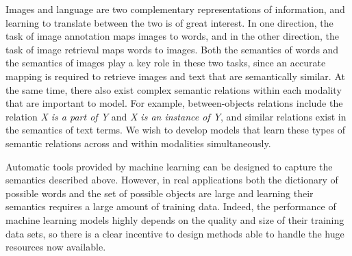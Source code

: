 
Images and language are two complementary representations of
information, and learning to translate between the two is of great
interest. In one direction, the task of image annotation maps images
to words, and in the other direction, the task of image retrieval maps
words to images. Both the semantics of words and the semantics of
images play a key role in these two tasks, since an accurate mapping
is required to retrieve images and text that are semantically similar. At
the same time, there also exist complex semantic relations within each
modality that are important to model.  For example, between-objects
relations include the relation {\em X is a part of Y} and {\em X is an
instance of Y}, and similar relations exist in the semantics of text
terms. We wish to develop models that learn these types of semantic
relations across and within modalities simultaneously.


Automatic tools provided by machine learning
can be designed to capture
the semantics described above.  However, in real applications both the
dictionary of possible words and the set of possible objects are large
and learning their semantics requires a large amount of training
data. Indeed, the performance of machine learning models highly
depends on the quality and size of their training data sets, so there
is a clear incentive to design methods able to handle the huge
resources now available.

